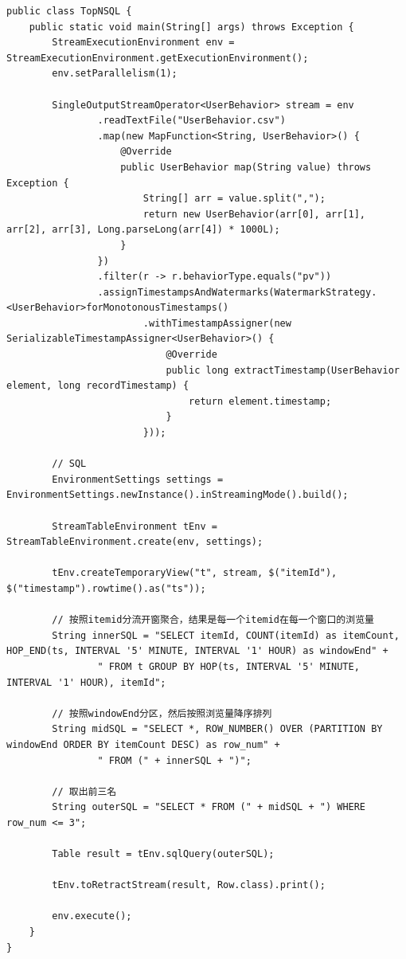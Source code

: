 \documentclass[cn,11pt,chinese]{elegantbook}
\begin{document}
\begin{verbatim}
public class TopNSQL {
    public static void main(String[] args) throws Exception {
        StreamExecutionEnvironment env = StreamExecutionEnvironment.getExecutionEnvironment();
        env.setParallelism(1);

        SingleOutputStreamOperator<UserBehavior> stream = env
                .readTextFile("UserBehavior.csv")
                .map(new MapFunction<String, UserBehavior>() {
                    @Override
                    public UserBehavior map(String value) throws Exception {
                        String[] arr = value.split(",");
                        return new UserBehavior(arr[0], arr[1], arr[2], arr[3], Long.parseLong(arr[4]) * 1000L);
                    }
                })
                .filter(r -> r.behaviorType.equals("pv"))
                .assignTimestampsAndWatermarks(WatermarkStrategy.<UserBehavior>forMonotonousTimestamps()
                        .withTimestampAssigner(new SerializableTimestampAssigner<UserBehavior>() {
                            @Override
                            public long extractTimestamp(UserBehavior element, long recordTimestamp) {
                                return element.timestamp;
                            }
                        }));

        // SQL
        EnvironmentSettings settings = EnvironmentSettings.newInstance().inStreamingMode().build();

        StreamTableEnvironment tEnv = StreamTableEnvironment.create(env, settings);

        tEnv.createTemporaryView("t", stream, $("itemId"), $("timestamp").rowtime().as("ts"));

        // 按照itemid分流开窗聚合，结果是每一个itemid在每一个窗口的浏览量
        String innerSQL = "SELECT itemId, COUNT(itemId) as itemCount, HOP_END(ts, INTERVAL '5' MINUTE, INTERVAL '1' HOUR) as windowEnd" +
                " FROM t GROUP BY HOP(ts, INTERVAL '5' MINUTE, INTERVAL '1' HOUR), itemId";

        // 按照windowEnd分区，然后按照浏览量降序排列
        String midSQL = "SELECT *, ROW_NUMBER() OVER (PARTITION BY windowEnd ORDER BY itemCount DESC) as row_num" +
                " FROM (" + innerSQL + ")";

        // 取出前三名
        String outerSQL = "SELECT * FROM (" + midSQL + ") WHERE row_num <= 3";

        Table result = tEnv.sqlQuery(outerSQL);

        tEnv.toRetractStream(result, Row.class).print();

        env.execute();
    }
}
\end{verbatim}
\end{document}
